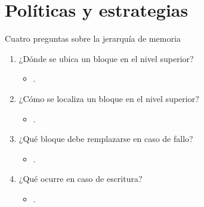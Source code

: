 \section{Políticas y estrategias}

\begin{frame}[t]{Cuatro preguntas sobre la jerarquía de memoria}
\begin{enumerate}
  \item ¿Dónde se ubica un bloque en el nivel superior?
    \begin{itemize}
      \item {}.
    \end{itemize}

  \item ¿Cómo se localiza un bloque en el nivel superior?
    \begin{itemize}
      \item {}.
    \end{itemize}

  \item ¿Qué bloque debe remplazarse en caso de fallo?
    \begin{itemize}
      \item {}.
    \end{itemize}


  \item ¿Qué ocurre en caso de escritura?
    \begin{itemize}
      \item {}.
    \end{itemize}

\end{enumerate}
\end{frame}

